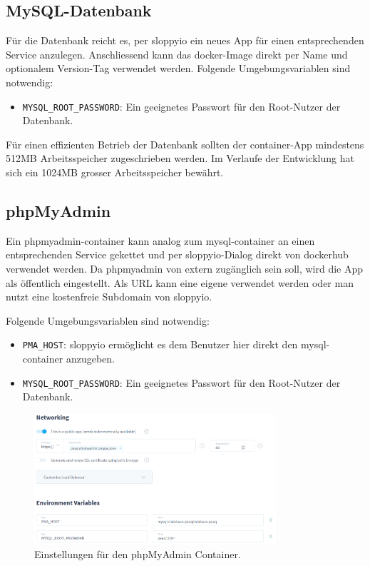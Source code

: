 \documentclass[../main.tex]{subfiles}
\begin{document}
	\subsection{MySQL-Datenbank}
	\par Für die Datenbank reicht es, per \gls{sloppyio} ein neues App für einen entsprechenden Service anzulegen. Anschliessend kann das \gls{docker}-Image direkt per Name und optionalem Version-Tag verwendet werden. Folgende Umgebungsvariablen sind notwendig:
	\begin{itemize}
		\item \texttt{MYSQL\_ROOT\_PASSWORD}: Ein geeignetes Passwort für den Root-Nutzer der Datenbank.
	\end{itemize}
	\par \noindent Für einen effizienten Betrieb der Datenbank sollten der \gls{container}-App mindestens 512MB Arbeitsspeicher zugeschrieben werden. Im Verlaufe der Entwicklung hat sich ein 1024MB grosser Arbeitsspeicher bewährt.
	
	\subsection{phpMyAdmin}
	\par Ein \gls{phpmyadmin}-\gls{container} kann analog zum \gls{mysql}-\gls{container} an einen entsprechenden Service gekettet und per \gls{sloppyio}-Dialog direkt von \gls{dockerhub} verwendet werden. Da \gls{phpmyadmin} von extern zugänglich sein soll, wird die App als öffentlich eingestellt. Als URL kann eine eigene verwendet werden oder man nutzt eine kostenfreie Subdomain von \gls{sloppyio}. 
	\par \noindent Folgende Umgebungsvariablen sind notwendig:
	\begin{itemize}
		\item \texttt{PMA\_HOST}: \gls{sloppyio} ermöglicht es dem Benutzer hier direkt den \gls{mysql}-\gls{container} anzugeben.
		\item \texttt{MYSQL\_ROOT\_PASSWORD}: Ein geeignetes Passwort für den Root-Nutzer der Datenbank.
	\end{itemize}
	
	\begin{figure}[H]
		\centering
		\includegraphics[width=0.8\textwidth]{../images/SloppyPHPPreferences} 
		\caption{Einstellungen für den phpMyAdmin Container.}
		\label{fig:SloppyPHPPreferences}
	\end{figure}
	
\end{document}
